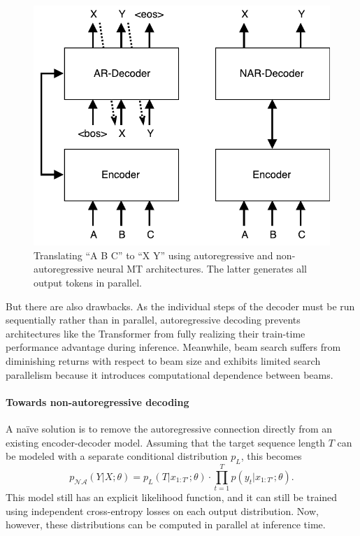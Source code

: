\documentclass{article} %
\begin{document}
\begin{figure} 
\vspace{-10pt}
\centering
\includegraphics[width=\linewidth]{figures/ar_nmt}
\caption{\label{fig.ar_vs_nar} Translating ``A B C'' to ``X Y'' using autoregressive and non-autoregressive neural MT architectures. The latter generates all output tokens in parallel.}\vspace{-20pt}
\end{figure}

But there are also drawbacks. As the individual steps of the decoder must be run sequentially rather than in parallel, autoregressive decoding prevents architectures like the Transformer from fully realizing their train-time performance advantage during inference. Meanwhile, beam search suffers from diminishing returns with respect to beam size \citep{koehn2017six} and exhibits limited search parallelism because it introduces computational dependence between beams.

\vspace{-5pt}
\paragraph{Towards non-autoregressive decoding}
A na\"{i}ve solution is to remove the autoregressive connection directly from an existing encoder-decoder model. Assuming that the target sequence length $T$ can be modeled with a separate conditional distribution $p_L$, this becomes
\begin{equation}
p_{\mathcal{NA}}(Y|X; \theta) = p_L(T|x_{1:T'};\theta)\cdot \prod_{t=1}^T p(y_t| x_{1:T'};\theta).
\label{eq.simple}
\end{equation}
This model still has an explicit likelihood function, and it can still be trained using independent cross-entropy losses on each output distribution. Now, however, these distributions can be computed in parallel at inference time. 
\end{document}
